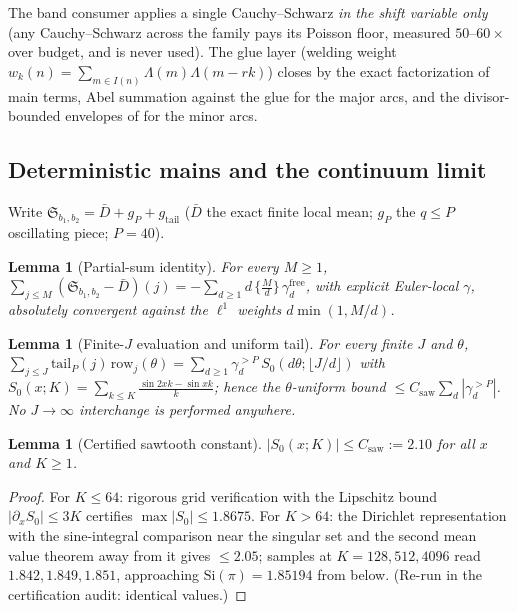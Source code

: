 \documentclass[11pt]{article}
\numberwithin{equation}{section}
\newtheorem{lemma}[theorem]{Lemma}
\theoremstyle{definition}
\theoremstyle{remark}
\newcommand{\LL}{\Lambda}
\newcommand{\SSS}{\mathfrak{S}}
\newcommand{\Si}{\mathrm{Si}}
\begin{document}
\noindent The band consumer applies a single Cauchy--Schwarz
\emph{in the shift variable only} (any Cauchy--Schwarz across the
family pays its Poisson floor, measured $50$--$60\times$ over
budget, and is never used). The glue layer (welding weight
$w_k(n)=\sum_{m\in I(n)}\LL(m)\LL(m-rk)$) closes by the exact
factorization of main terms, Abel summation against the glue for
the major arcs, and the divisor-bounded envelopes of
\cite[Prop.~5.4, App.~A]{MRT} for the minor arcs.

\subsection{Deterministic mains and the continuum
limit}\label{s:fm:mains}

Write $\SSS_{b_1,b_2}=\bar D+g_P+g_{\mathrm{tail}}$ ($\bar D$ the
exact finite local mean; $g_P$ the $q\le P$ oscillating piece;
$P=40$).

\begin{lemma}[Partial-sum identity]\label{l:PS}
For every $M\ge1$,
$\displaystyle\sum_{j\le M}(\SSS_{b_1,b_2}-\bar D)(j)=
-\sum_{d\ge1}d\,\bigl\{\tfrac Md\bigr\}\,
\gamma^{\mathrm{free}}_d$, with explicit Euler-local $\gamma$,
absolutely convergent against the $\ell^1$ weights
$d\min(1,M/d)$.
\end{lemma}

\begin{lemma}[Finite-$J$ evaluation and uniform
tail]\label{l:E3}
For every finite $J$ and $\theta$,
$\sum_{j\le J}\mathrm{tail}_P(j)\,\mathrm{row}_j(\theta)
=\sum_{d\ge1}\gamma_d^{>P}\,S_0(d\theta;\lfloor J/d\rfloor)$
with $S_0(x;K)=\sum_{k\le K}\frac{\sin2xk-\sin xk}{k}$; hence the
$\theta$-uniform bound $\le C_{\mathrm{saw}}\sum_d
|\gamma_d^{>P}|$. No $J\to\infty$ interchange is performed
anywhere.
\end{lemma}

\begin{lemma}[Certified sawtooth constant]\label{l:S0}
$|S_0(x;K)|\le C_{\mathrm{saw}}:=2.10$ for all $x$ and $K\ge1$.
\end{lemma}

\begin{proof}
For $K\le64$: rigorous grid verification with the Lipschitz bound
$|\partial_xS_0|\le3K$ certifies $\max|S_0|\le1.8675$. For
$K>64$: the Dirichlet representation with the sine-integral
comparison near the singular set and the second mean value
theorem away from it gives $\le2.05$; samples at $K=128,512,4096$
read $1.842,1.849,1.851$, approaching $\Si(\pi)=1.85194$ from
below. (Re-run in the certification audit: identical values.)
\end{proof}
\end{document}
